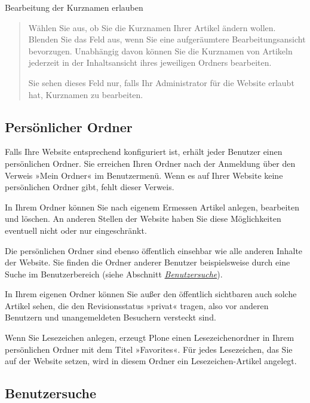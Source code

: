 \documentclass[a4paper,12pt,ngerman]{manual}
\begin{document}
Bearbeitung der Kurznamen erlauben
\begin{quote}

Wählen Sie aus, ob Sie die Kurznamen
Ihrer Artikel ändern wollen. Blenden Sie das Feld aus, wenn Sie eine
aufgeräumtere Bearbeitungsansicht bevorzugen. Unabhängig davon können Sie
die Kurznamen von Artikeln jederzeit in der Inhaltsansicht ihres jeweiligen
Ordners bearbeiten.

Sie sehen dieses Feld nur, falls Ihr Administrator für die Website
erlaubt hat, Kurznamen zu bearbeiten.
\end{quote}
\hypertarget{sec-mitgliedsordner}{}

\subsection{Persönlicher Ordner}

Falls Ihre Website entsprechend konfiguriert ist, erhält jeder Benutzer einen
persönlichen Ordner. Sie erreichen Ihren Ordner nach der Anmeldung über den
Verweis »Mein Ordner« im Benutzermenü. Wenn es auf Ihrer Website keine
persönlichen Ordner gibt, fehlt dieser Verweis.

In Ihrem Ordner können Sie nach eigenem Ermessen Artikel anlegen,
bearbeiten und löschen. An anderen Stellen der Website haben Sie diese
Möglichkeiten eventuell nicht oder nur eingeschränkt.

Die persönlichen Ordner sind ebenso öffentlich einsehbar wie alle
anderen Inhalte der Website. Sie finden die Ordner anderer Benutzer
beispielsweise durch eine Suche im Benutzerbereich (siehe
Abschnitt \hyperlink{sec-mitgliedersuche}{\emph{Benutzersuche}}).

In Ihrem eigenen Ordner können Sie außer den öffentlich sichtbaren
auch solche Artikel sehen, die den Revisionsstatus
»privat« tragen, also vor anderen Benutzern und unangemeldeten
Besuchern versteckt sind.

Wenn Sie Lesezeichen anlegen, erzeugt Plone einen Lesezeichenordner in Ihrem
persönlichen Ordner mit dem Titel »Favorites«. Für jedes Lesezeichen, das
Sie auf der Website setzen, wird in diesem Ordner ein Lesezeichen-Artikel
angelegt.
\hypertarget{sec-mitgliedersuche}{}

\subsection{Benutzersuche}
\end{document}
